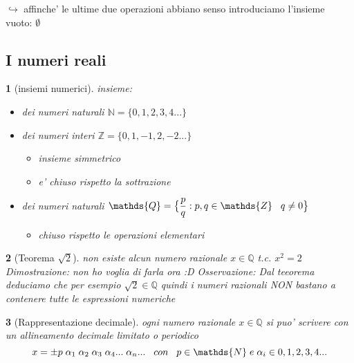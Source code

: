\documentclass{book}
\theoremstyle{mystyle}
\newtheorem*{mydefinition}{}
\begin{document}
$\hookrightarrow$ affinche' le ultime due operazioni abbiano senso introduciamo l'insieme vuoto: $\emptyset$ 

\subsection{ I numeri reali}
\begin{mydefinition}[insiemi numerici] 
insieme:
\newline
    \begin{itemize}
        \item  dei \emph{numeri naturali} $\mathds{N}=\{ 0,1,2,3,4... \}$
        \item  dei \emph{numeri interi} $\mathds{Z}=\{ 0,1,-1,2,-2... \}$
        \begin{itemize}
            \item insieme simmetrico
            \item e' chiuso rispetto la sottrazione
        \end{itemize}
        \item  dei \emph{numeri naturali} $\mathds{Q}= \bigl \{ \dfrac{p}{q}:p,q\in \mathds{Z} \hspace{3mm} q\neq 0 \bigr \}$
        \begin{itemize}
            \item  chiuso rispetto le operazioni elementari
        \end{itemize}
        
    \end{itemize}
\end{mydefinition}

\begin{mydefinition}[Teorema $\sqrt{2}$]
    non esiste alcun numero razionale   $x \in \mathds{Q}$ t.c. $x^2=2$
    \newline
    \emph{Dimostrazione}: \newline
    non ho voglia di farla ora :D
    \emph{Osservazione}: 
    \newline
    Dal teeorema deduciamo che per esempio $\sqrt{2} \in \mathds{Q}$ quindi i numeri razionali NON bastano a contenere tutte le espressioni numeriche
\end{mydefinition}

\begin{mydefinition}[Rappresentazione decimale]
ogni numero razionale $x \in \mathds{Q}$ si puo' scrivere con un allineamento decimale limitato o periodico
$$  x=\pm p \; \alpha_1 \; \alpha_2 \; \alpha_3 \; \alpha_4... \;\alpha_n... \hspace{3mm} con \hspace{3mm} p \in \mathds{N} \;e \;\alpha_i \in {0,1,2,3,4...}
$$
  
\end{mydefinition}
\end{document}
